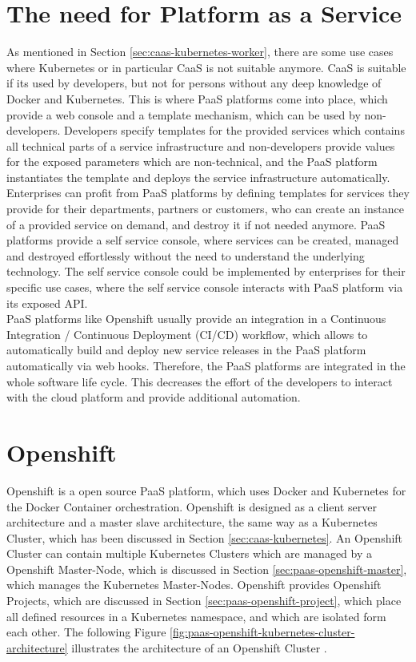\section{The need for Platform as a Service}
\label{sec:paas-need-for-paas}
As mentioned in Section \vref{sec:caas-kubernetes-worker}, there are some use cases where Kubernetes or in particular CaaS is not suitable anymore. CaaS is suitable if its used by developers, but not for persons without any deep knowledge of Docker and Kubernetes. This is where PaaS platforms come into place, which provide a web console and a template mechanism, which can be used by non-developers. Developers specify templates for the provided services which contains all technical parts of a service infrastructure and non-developers provide values for the exposed parameters which are non-technical, and the PaaS platform instantiates the template and deploys the service infrastructure automatically. \\

Enterprises can profit from PaaS platforms by defining templates for services they provide for their departments, partners or customers, who can create an instance of a provided service on demand, and destroy it if not needed anymore. PaaS platforms provide a self service console, where services can be created, managed and destroyed effortlessly without the need to understand the underlying technology. The self service console could be implemented by enterprises for their specific use cases, where the self service console interacts with PaaS platform via its exposed API. \\

PaaS platforms like Openshift usually provide an integration in a Continuous Integration / Continuous Deployment (CI/CD) workflow, which allows to automatically build and deploy new service releases in the PaaS platform automatically via web hooks. Therefore, the PaaS platforms are integrated in the whole software life cycle. This decreases the effort of the developers to interact with the cloud platform and provide additional automation.
 
\section{Openshift}
\label{sec:paas-openshift}
Openshift is a open source PaaS platform, which uses Docker and Kubernetes for the Docker Container orchestration. Openshift is designed as a client server architecture and a master slave architecture, the same way as a Kubernetes Cluster, which has been discussed in Section \vref{sec:caas-kubernetes}. An Openshift Cluster can contain multiple Kubernetes Clusters which are managed by a Openshift Master-Node, which is discussed in Section \vref{sec:paas-openshift-master}, which manages the Kubernetes Master-Nodes. Openshift provides Openshift Projects, which are discussed in Section \vref{sec:paas-openshift-project}, which place all defined resources in a Kubernetes namespace, and which are isolated form each other. The following Figure \vref{fig:paas-openshift-kubernetes-cluster-architecture} illustrates the architecture of an Openshift Cluster \cite{OpenshiftDeepDive2014, OpenshiftCoreConcepts2018}.

